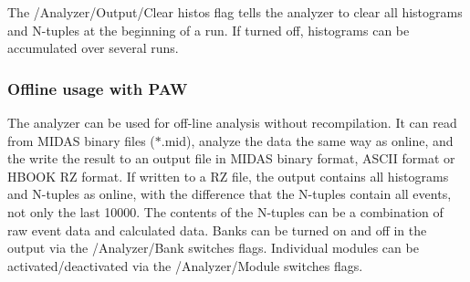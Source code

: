 The /Analyzer/Output/Clear histos flag tells the analyzer to clear all histograms and N-\/tuples at the beginning of a run. If turned off, histograms can be accumulated over several runs.\hypertarget{DataAnalysis_PAW_Offline_usage}{}\subsubsection{Offline usage with PAW}\label{DataAnalysis_PAW_Offline_usage}
The analyzer can be used for off-\/line analysis without recompilation. It can read from MIDAS binary files ($\ast$.mid), analyze the data the same way as online, and the write the result to an output file in MIDAS binary format, ASCII format or HBOOK RZ format. If written to a RZ file, the output contains all histograms and N-\/tuples as online, with the difference that the N-\/tuples contain all events, not only the last 10000. The contents of the N-\/tuples can be a combination of raw event data and calculated data. Banks can be turned on and off in the output via the /Analyzer/Bank switches flags. Individual modules can be activated/deactivated via the /Analyzer/Module switches flags.

